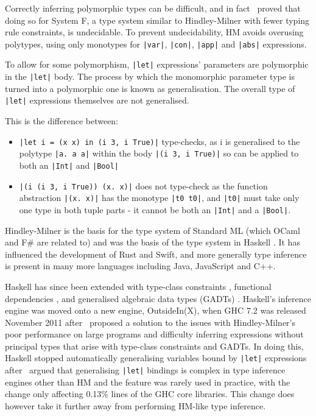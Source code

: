 \documentclass[a4paper,fleqn,12pt]{article}
\begin{document}
Correctly inferring polymorphic types can be difficult, and in fact~\cite{ref14} proved that doing so for System F, a type system similar to Hindley-Milner with fewer typing rule constraints, is undecidable. To prevent undecidability, HM avoids overusing polytypes, using only monotypes for \texttt{|var|}, \texttt{|con|}, \texttt{|app|} and \texttt{|abs|} expressions.

To allow for some polymorphism, \texttt{|let|} expressions’ parameters are polymorphic in the \texttt{|let|} body. The process by which the monomorphic parameter type is turned into a polymorphic one is known as generalisation. The overall type of \texttt{|let|} expressions themselves are not generalised.

This is the difference between:
\begin{itemize}
  \item \texttt{|let i = (\lambda x \rightarrow x) in (i 3, i True)|} type-checks, as i is generalised to the polytype \texttt{|\forall a. a \rightarrow a|} within the body \texttt{|(i 3, i True)|} so can be applied to both an \texttt{|Int|} and \texttt{|Bool|}
  \item \texttt{|(\lambda i \rightarrow (i 3, i True)) (\lambda x. x)|} does not type-check as the function abstraction \texttt{|(\lambda x. x)|} has the monotype \texttt{|t0 \rightarrow t0|}, and \texttt{|t0|} must take only one type in both tuple parts - it cannot be both an \texttt{|Int|} and a \texttt{|Bool|}.
\end{itemize}

Hindley-Milner is the basis for the type system of Standard ML \citep{ref15} (which OCaml and F\# are related to) and was the basis of the type system in Haskell \citep{ref16}. It has influenced the development of Rust and Swift, and more generally type inference is present in many more languages including Java, JavaScript and C++.

Haskell has since been extended with type-class constraints \citep{ref17}, functional dependencies \citep{ref18}, and generalised algebraic data types (GADTs) \citep{ref19}. Haskell’s inference engine was moved onto a new engine, OutsideIn(X), when GHC 7.2 was released November 2011 after~\cite{ref20} proposed a solution to the issues with Hindley-Milner’s poor performance on large programs and difficulty inferring expressions without principal types that arise with type-class constraints and GADTs. In doing this, Haskell stopped automatically generalising variables bound by \texttt{|let|} expressions after~\cite{ref21} argued that generalising \texttt{|let|} bindings is complex in type inference engines other than HM and the feature was rarely used in practice, with the change only affecting 0.13\% lines of the GHC core libraries. This change does however take it further away from performing HM-like type inference.
\end{document}

